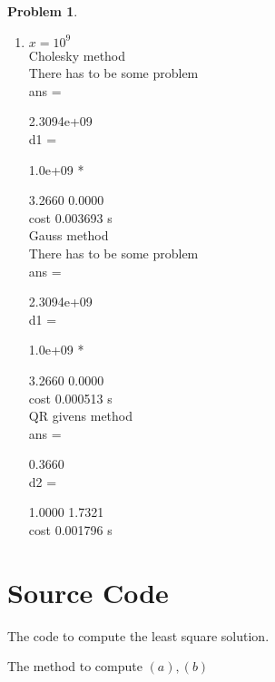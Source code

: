 \documentclass[a4paper]{article}
\theoremstyle{definition}
\newtheorem{problem}{Problem}
\theoremstyle{plain}
\numberwithin{equation}{problem}
\begin{document}
\begin{problem}
\begin{enumerate}
\begin{enumerate}
   1.4149e+07


d1 =

   1.0e+07 *

    2.0010    0.0000

cost 0.002820s

Gauss method

ans =

   1.4149e+07


d1 =

   1.0e+07 *

    2.0010    0.0000

cost 0.000503 s

QR Givens method

ans =

    0.3660


d2 =

    1.0000    1.7321

cost 0.001068 s
            \item  $ x=10^9 $\\


Cholesky method\\
There has to be some problem
\\ans =

   2.3094e+09
\\

d1 =

   1.0e+09 *

    3.2660    0.0000
\\
cost 0.003693 s\\
Gauss method\\
There has to be some problem\\
ans =

   2.3094e+09
\\

d1 =

   1.0e+09 *

    3.2660    0.0000
\\
cost 0.000513 s\\
QR givens method\\

ans =

    0.3660
\\

d2 =

    1.0000    1.7321
\\
cost 0.001796 s  
         \end{enumerate}
        \section{Source Code}
        \label{sec:code}
         
         
         
         
         The code to compute the least square solution.
         
         The method to compute  $ (a),(b) $ 
         
    \end{enumerate}
    
\end{problem}
\end{document}
